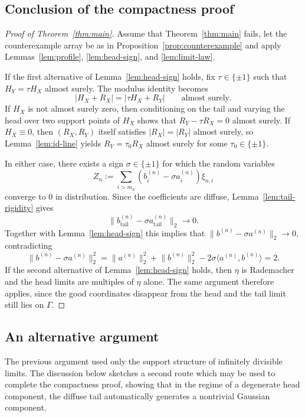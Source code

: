 \documentclass[11pt]{amsart}
\numberwithin{equation}{section}
\theoremstyle{definition}
\theoremstyle{remark}
\newcommand{\abs}[1]{\lvert #1 \rvert}
\newcommand{\norm}[1]{\lVert #1 \rVert}
\newcommand{\ip}[2]{\langle #1,#2\rangle}
\begin{document}
\subsection{Conclusion of the compactness proof}

\begin{proof}[Proof of Theorem~\ref{thm:main}]
Assume that Theorem~\ref{thm:main} fails, let the counterexample array be as
in Proposition~\ref{prop:counterexample} and apply
Lemmas~\ref{lem:profile}, \ref{lem:head-sign}, and \ref{lem:limit-law}.

If the first alternative of Lemma~\ref{lem:head-sign} holds, fix
$\tau\in\{\pm1\}$ such that $H_Y=\tau H_X$ almost surely.  The  modulus
identity becomes
\[
\abs{H_X+R_X}=\abs{\tau H_X+R_Y}
\qquad\text{almost surely.}
\]
If $H_X$ is not almost surely zero, then conditioning on the tail and varying
the head over two support points of $H_X$ shows that
$R_Y-\tau R_X=0$ almost surely.  If $H_X\equiv0$, then
$(R_X,R_Y)$ itself satisfies $\abs{R_X}=\abs{R_Y}$ almost surely, so
Lemma~\ref{lem:id-line} yields
$R_Y=\tau_0 R_X$ almost surely for some $\tau_0\in\{\pm1\}$.

In either case, there exists a sign $\sigma\in\{\pm1\}$ for which the random variables
\[
Z_n:=\sum_{i>m_n}(b_i^{(n)}-\sigma a_i^{(n)})\xi_{n,i}
\]
converge to $0$ in distribution.  Since the coefficients are diffuse,
Lemma~\ref{lem:tail-rigidity} gives
\[
\norm{b_{\mathrm{tail}}^{(n)}-\sigma a_{\mathrm{tail}}^{(n)}}_2\to0.
\]
Together with Lemma~\ref{lem:head-sign} this implies that
$\norm{b^{(n)}-\sigma a^{(n)}}_2\to0$, contradicting
\[
\norm{b^{(n)}-\sigma a^{(n)}}_2^2
=\norm{a^{(n)}}_2^2+\norm{b^{(n)}}_2^2
-2\sigma\ip{a^{(n)}}{b^{(n)}}=2.
\]
If the second alternative of Lemma~\ref{lem:head-sign} holds, then
$\eta$ is Rademacher and the head limits are multiples of $\eta$ alone.  The
same argument therefore applies, since the good coordinates disappear from
the head and the tail limit still lies on $\Gamma$.
\end{proof}

\subsection{An alternative argument}\label{ssec:gaussian-alt}
The previous argument used only the support structure of infinitely divisible
limits.  The discussion below sketches a second route which may be used to complete the compactness proof, showing that in the regime of a degenerate head component, the
diffuse tail automatically generates a nontrivial Gaussian component.
\end{document}
